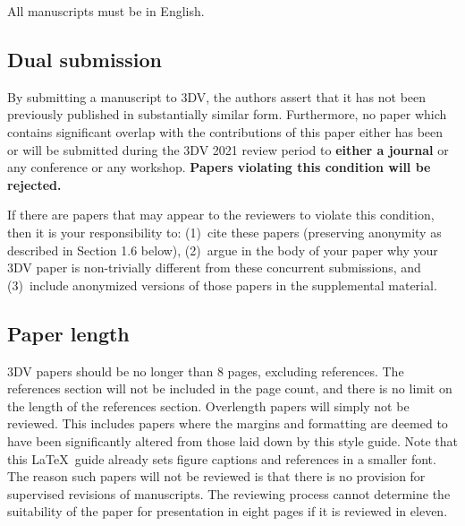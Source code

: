 \documentclass[10pt,twocolumn,letterpaper]{article}
\begin{document}
All manuscripts must be in English.

\subsection{Dual submission}

By submitting a manuscript to 3DV, the authors assert that it has not been
previously published in substantially similar form. Furthermore, no paper
which contains significant overlap with the contributions of this paper
either has been or will be submitted during the 3DV 2021 review period to
{\bf either a journal} or any conference or any
workshop.
 {\bf Papers violating this condition will be rejected.}

If there are papers that may appear to the reviewers
to violate this condition, then it is your responsibility to: (1)~cite
these papers (preserving anonymity as described in Section 1.6 below),
(2)~argue in the body of your paper why your 3DV paper is non-trivially
different from these concurrent submissions, and (3)~include anonymized
versions of those papers in the supplemental material.

\subsection{Paper length}
3DV papers should be no longer than 8 pages, excluding references.
The references section will not be included in the page count, and
there is no limit on the length of the references section. Overlength
papers will simply not be reviewed.  This includes papers where the
margins and formatting are deemed to have been significantly altered
from those laid down by this style guide.  Note that this \LaTeX\
guide already sets figure captions and references in a smaller font.
The reason such papers will not be reviewed is that there is no
provision for supervised revisions of manuscripts.  The reviewing
process cannot determine the suitability of the paper for presentation
in eight pages if it is reviewed in eleven.

\end{document}
